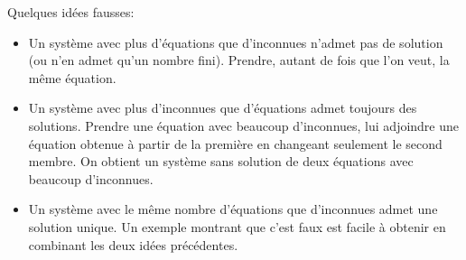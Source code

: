 Quelques idées fausses:
\begin{itemize}
 \item Un système avec plus d'équations que d'inconnues n'admet pas de solution (ou n'en admet qu'un nombre fini). Prendre, autant de fois que l'on veut, la même équation.
 \item Un système avec plus d'inconnues que d'équations admet toujours des solutions. Prendre une équation avec beaucoup d'inconnues, lui adjoindre une équation obtenue à partir de la première en changeant seulement le second membre. On obtient un système sans solution de deux équations avec beaucoup d'inconnues.
 \item Un système avec le même nombre d'équations que d'inconnues admet une solution unique. Un exemple montrant que c'est faux est facile à obtenir en combinant les deux idées précédentes.
\end{itemize}


